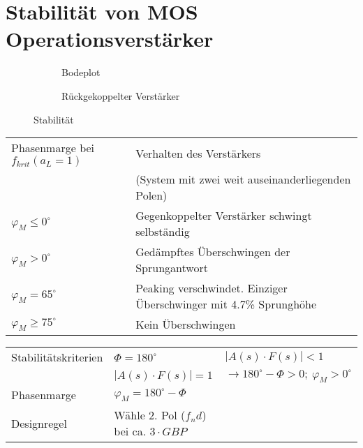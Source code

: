 \section{Stabilität von MOS Operationsverstärker}
\begin{figure}[!h]
	\centering
	\begin{subfigure}[b]{10cm}
		\centering
		\caption{Bodeplot}
	\end{subfigure}\qquad
	\begin{subfigure}[b]{8cm}
		\centering
		{}
		\caption{Rückgekoppelter Verstärker}
	\end{subfigure}
	\caption{Stabilität}
	\label{fig:stabilitaet}
\end{figure}

\begin{tabular}{|l|l|}
\hline
	Phasenmarge bei $f_{krit}(a_L=1)$ &
	Verhalten des Verstärkers \\
	& (System mit zwei weit auseinanderliegenden Polen) \\\hline
	$\varphi_M \leq 0^\circ$ & 
	Gegenkoppelter Verstärker schwingt selbständig \\\hline
	$\varphi_M > 0^\circ$ &
	Gedämpftes Überschwingen der Sprungantwort \\\hline
	$\varphi_M = 65^\circ$ &
	Peaking verschwindet. Einziger Überschwinger mit 4.7\% Sprunghöhe \\\hline
	$\varphi_M \geq 75^\circ$ &
	Kein Überschwingen \\\hline
\end{tabular}

\begin{tabular}{lll}
Stabilitätskriterien & $\Phi = 180^\circ$ & $ \left|A(s)\cdot F(s)\right|<1 $ \\
& $ \left|A(s)\cdot F(s)\right|= 1 $ & $ \rightarrow 180^\circ-\Phi>0;\
\varphi_M>0^\circ $ \\
Phasenmarge & $\varphi_M=180^\circ-\Phi $ & \\
Designregel & Wähle 2. Pol ($f_nd$) bei ca. $3\cdot GBP$& \\
\end{tabular}
